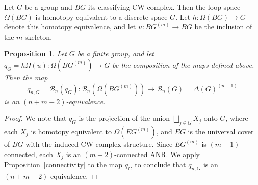\documentclass{amsart}
\numberwithin{equation}{section}
\theoremstyle{plain}
\newtheorem{prop}[thm]{Proposition}
\theoremstyle{definition}
\begin{document}
Let $G$ be a group and $BG$  its classifying CW-complex. Then the loop space $\Omega(BG)$ is homotopy equivalent to a discrete space $G$.
Let $h:\Omega(BG)\to G$ denote this homotopy equivalence, and let $u:BG^{(m)}\to BG$ be the inclusion of the $m$-skeleton.

\begin{prop}\label{q_G}
Let $G$ be a finite group, and let
$q_G=h\Omega(u):\Omega(BG^{(m)})\to G$ be the composition of the maps defined above. 
Then the map $$q_{n,G}=\mathcal B_n(q_G):\mathcal B_n(\Omega(BG^{(m)}))\to\mathcal B_n(G)=\Delta(G)^{(n-1)}$$ is an $(n+m-2)$-equivalence.
\end{prop}
\begin{proof}
We note that $q_G$ is the projection of the union $\bigsqcup_{j\in G}X_j$ onto $G$, where each $X_j$ is homotopy equivalent to $\Omega(EG^{(m)})$, and
$EG$ is the universal cover of $BG$ with the induced CW-complex structure.
Since $EG^{(m)}$ is $(m-1)$-connected, each $X_j$ is an $(m-2)$-connected ANR. We apply
Proposition~\ref{connectivity} to the map $q_G$ to conclude that $q_{n,G}$
 is an $(n+m-2)$-equivalence.
\end{proof}
\end{document}
